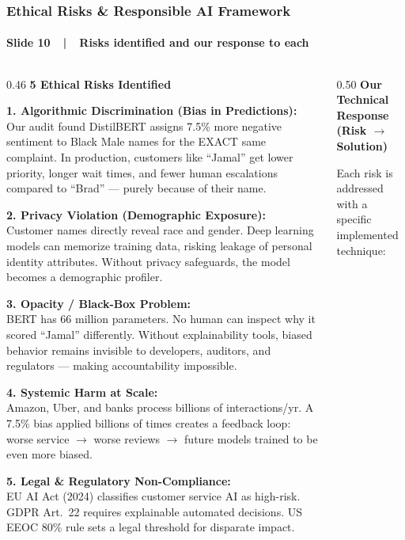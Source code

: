 \documentclass[aspectratio=43,11pt]{beamer}
\begin{document}
\begin{frame}[t]
\frametitle{Ethical Risks \& Responsible AI Framework}
\framesubtitle{Slide 10~~|~~Risks identified and our response to each}

\vspace{-2pt}
\begin{columns}[T]
\begin{column}{0.46\textwidth}
{\small\bfseries\color{RedAccent} 5 Ethical Risks Identified}\\[3pt]
{\scriptsize
\textbf{1. Algorithmic Discrimination (Bias in Predictions):}\\
Our audit found DistilBERT assigns 7.5\% more negative sentiment to Black Male names for the EXACT same complaint.
In production, customers like ``Jamal'' get lower priority, longer wait times, and fewer human escalations compared to ``Brad'' --- purely because of their name.

\vspace{3pt}
\textbf{2. Privacy Violation (Demographic Exposure):}\\
Customer names directly reveal race and gender. Deep learning models can memorize training data, risking leakage of personal identity attributes.
Without privacy safeguards, the model becomes a demographic profiler.

\vspace{3pt}
\textbf{3. Opacity / Black-Box Problem:}\\
BERT has 66 million parameters. No human can inspect why it scored ``Jamal'' differently.
Without explainability tools, biased behavior remains invisible to developers, auditors, and regulators --- making accountability impossible.

\vspace{3pt}
\textbf{4. Systemic Harm at Scale:}\\
Amazon, Uber, and banks process billions of interactions/yr.
A 7.5\% bias applied billions of times creates a feedback loop: worse service $\rightarrow$ worse reviews $\rightarrow$ future models trained to be even more biased.

\vspace{3pt}
\textbf{5. Legal \& Regulatory Non-Compliance:}\\
EU AI Act (2024) classifies customer service AI as high-risk.
GDPR Art.\ 22 requires explainable automated decisions.
US EEOC 80\% rule sets a legal threshold for disparate impact.
}
\end{column}
\begin{column}{0.50\textwidth}
{\small\bfseries\color{GreenAccent} Our Technical Response (Risk $\rightarrow$ Solution)}\\[3pt]
{\scriptsize
Each risk is addressed with a specific implemented technique:

}
\end{column}
\end{columns}
\end{frame}
\end{document}
